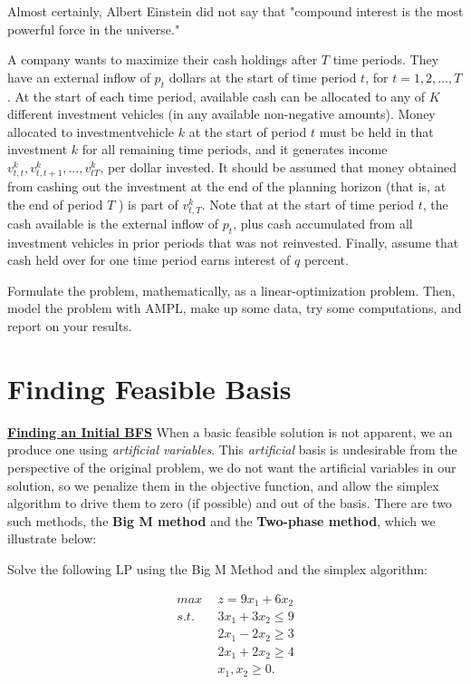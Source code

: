 Almost certainly, Albert Einstein did not say that "compound interest is the most powerful force in the universe."

A company wants to maximize their cash holdings after $T$ time periods. They have an external inflow of $p_{t}$ dollars at the start of time period $t$, for $t=1,2, \ldots, T$. At the start of each time period, available cash can be allocated to any of $K$ different investment vehicles (in any available non-negative amounts). Money allocated to investmentvehicle $k$ at the start of period $t$ must be held in that investment $k$ for all remaining time periods, and it generates income $v_{t, t}^{k}, v_{t, t+1}^{k}, \ldots, v_{t T}^{k}$, per dollar invested. It should be assumed that money obtained from cashing out the investment at the end of the planning horizon (that is, at the end of period $T$ ) is part of $v_{t, T}^{k}$. Note that at the start of time period $t$, the cash available is the external inflow of $p_{t}$, plus cash accumulated from all investment vehicles in prior periods that was not reinvested. Finally, assume that cash held over for one time period earns interest of $q$ percent.

Formulate the problem, mathematically, as a linear-optimization problem. Then, model the problem with AMPL, make up some data, try some computations, and report on your results.



\section{Finding Feasible Basis}

\underline{\bf Finding an Initial BFS}
When a basic feasible solution is not apparent, we an produce one using {\it artificial variables}.  This {\it artificial} basis is undesirable from the perspective of the original problem, we do not want the artificial variables in our solution, so we penalize them in the objective function, and allow the simplex algorithm to drive them to zero (if possible) and out of the basis.  There are two such methods, the {\bf Big M method} and the {\bf Two-phase method}, which we illustrate below:

\vspace{10mm}  Solve the following LP using the Big M Method and the simplex algorithm:

\begin{align*}
max~~ & z = 9x_1 + 6x_2 \\
s.t.~~
&  3x_1 + 3x_2 \le 9 \\
&  2x_1 - 2x_2 \ge 3 \\
&  2x_1 + 2x_2 \ge 4 \\
& x_1, x_2 \ge 0. \\
\end{align*}

